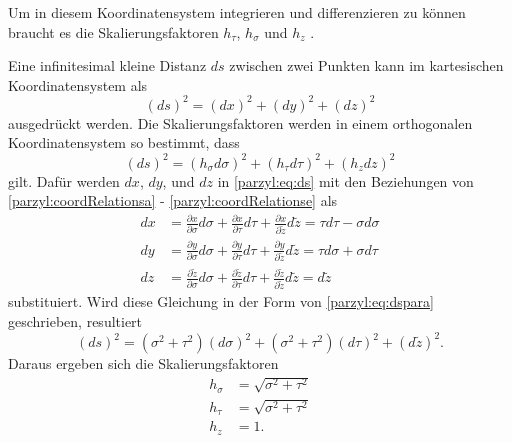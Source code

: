 Um in diesem Koordinatensystem integrieren und differenzieren zu 
können braucht es die Skalierungsfaktoren $h_{\tau}$, $h_{\sigma}$ und $h_{z}$ \cite{parzyl:scalefac}.

Eine infinitesimal kleine Distanz $ds$ zwischen zwei Punkten
kann im kartesischen Koordinatensystem als
\begin{equation}
    \left(ds\right)^2 = \left(dx\right)^2 + \left(dy\right)^2 + 
    \left(dz\right)^2
    \label{parzyl:eq:ds}
\end{equation}
ausgedrückt werden.
Die Skalierungsfaktoren werden in einem orthogonalen Koordinatensystem so bestimmt, dass
\begin{equation}
    \left(ds\right)^2 = \left(h_{\sigma}d\sigma\right)^2 + 
    \left(h_{\tau}d\tau\right)^2 + \left(h_z dz\right)^2
\label{parzyl:eq:dspara}
\end{equation}
gilt.
Dafür werden $dx$, $dy$, und $dz$ in \eqref{parzyl:eq:ds} mit den Beziehungen
von \eqref{parzyl:coordRelationsa} - \eqref{parzyl:coordRelationse} als
\begin{align}
    dx  &= \frac{\partial x }{\partial \sigma} d\sigma + 
        \frac{\partial x }{\partial \tau} d\tau + 
        \frac{\partial x }{\partial \tilde{z}} d \tilde{z} 
        = \tau d\tau - \sigma d \sigma \\
    dy &= \frac{\partial y }{\partial \sigma} d\sigma + 
        \frac{\partial y }{\partial \tau} d\tau +
        \frac{\partial y }{\partial \tilde{z}} d \tilde{z} 
        = \tau d\sigma + \sigma d \tau  \\
    dz &= \frac{\partial \tilde{z} }{\partial \sigma} d\sigma + 
        \frac{\partial \tilde{z} }{\partial \tau} d\tau +
        \frac{\partial \tilde{z} }{\partial \tilde{z}} d \tilde{z} 
        = d \tilde{z}
\end{align}
substituiert.
Wird diese Gleichung in der Form von \eqref{parzyl:eq:dspara}
geschrieben, resultiert
\begin{equation}
    \left(d s\right)^2 = 
        \left(\sigma^2 + \tau^2\right)\left(d\sigma\right)^2 + 
        \left(\sigma^2 + \tau^2\right)\left(d\tau\right)^2 +
        \left(d \tilde{z}\right)^2.
\end{equation}
Daraus ergeben sich die Skalierungsfaktoren 
\begin{align}
    h_{\sigma} &= \sqrt{\sigma^2 + \tau^2}\\
    h_{\tau} &= \sqrt{\sigma^2 + \tau^2}\\
    h_{z} &= 1.
\end{align}
